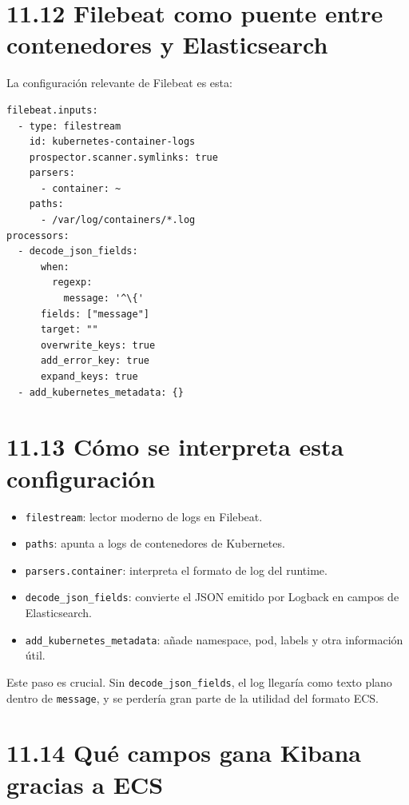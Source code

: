 \documentclass[
a4paper,
12pt]{report}
\providecommand{\tightlist}{%
  \setlength{\itemsep}{0pt}\setlength{\parskip}{0pt}}
\begin{document}
\section{11.12 Filebeat como puente entre contenedores y
Elasticsearch}\label{filebeat-como-puente-entre-contenedores-y-elasticsearch}

La configuración relevante de Filebeat es esta:

\begin{verbatim}
filebeat.inputs:
  - type: filestream
    id: kubernetes-container-logs
    prospector.scanner.symlinks: true
    parsers:
      - container: ~
    paths:
      - /var/log/containers/*.log
processors:
  - decode_json_fields:
      when:
        regexp:
          message: '^\{'
      fields: ["message"]
      target: ""
      overwrite_keys: true
      add_error_key: true
      expand_keys: true
  - add_kubernetes_metadata: {}
\end{verbatim}

\section{11.13 Cómo se interpreta esta
configuración}\label{cuxf3mo-se-interpreta-esta-configuraciuxf3n}

\begin{itemize}
\tightlist
\item
  \texttt{filestream}: lector moderno de logs en Filebeat.
\item
  \texttt{paths}: apunta a logs de contenedores de Kubernetes.
\item
  \texttt{parsers.container}: interpreta el formato de log del runtime.
\item
  \texttt{decode\_json\_fields}: convierte el JSON emitido por Logback
  en campos de Elasticsearch.
\item
  \texttt{add\_kubernetes\_metadata}: añade namespace, pod, labels y
  otra información útil.
\end{itemize}

Este paso es crucial. Sin \texttt{decode\_json\_fields}, el log llegaría
como texto plano dentro de \texttt{message}, y se perdería gran parte de
la utilidad del formato ECS.

\section{11.14 Qué campos gana Kibana gracias a
ECS}\label{quuxe9-campos-gana-kibana-gracias-a-ecs}
\end{document}
